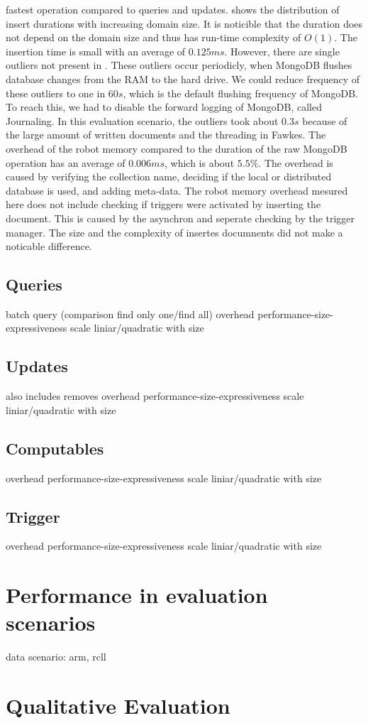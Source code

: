 fastest operation compared to queries and
updates.  shows the distribution of
insert durations with increasing domain size. It is noticible that the
duration does not depend on the domain size and thus has run-time
complexity of $O(1)$. The insertion time is small with an average of
$0.125ms$. However, there are single outliers not present in
. These outliers occur periodicly, when
MongoDB flushes database changes from the RAM to the hard drive. We
could reduce frequency of these outliers to one in $60s$, which is the
default flushing frequency of MongoDB. To reach this, we had to
disable the forward logging of MongoDB, called Journaling. In this
evaluation scenario, the outliers took about $0.3s$ because of the
large amount of written documents and the threading in Fawkes.  The
overhead of the robot memory compared to the duration of the raw
MongoDB operation has an average of $0.006ms$, which is about $5.5\%$.
The overhead is caused by verifying the collection name, deciding if
the local or distributed database is used, and adding meta-data.  The
robot memory overhead mesured here does not include checking if
triggers were activated by inserting the document. This is caused by
the asynchron and seperate checking by the trigger manager. The size
and the complexity of insertes documnents did not make a noticable
difference.

\subsection{Queries}
\label{sec:queries}
batch query
(comparison find only one/find all)
overhead
performance-size-expressiveness
scale liniar/quadratic with size

\subsection{Updates}
\label{sec:updates}
also includes removes
overhead
performance-size-expressiveness
scale liniar/quadratic with size


\subsection{Computables}
\label{sec:eval-computables}
overhead
performance-size-expressiveness
scale liniar/quadratic with size
\subsection{Trigger}
\label{sec:eval-trigger}
overhead
performance-size-expressiveness
scale liniar/quadratic with size


\section{Performance in evaluation scenarios}
\label{sec:performance}

data scenario: arm, rcll

\section{Qualitative Evaluation}
